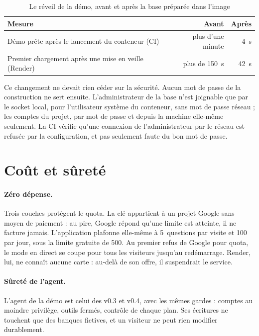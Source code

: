 \documentclass[11pt,a4paper]{article}
\begin{document}
\begin{table}[H]
\centering\small
\begin{tabularx}{\linewidth}{@{}Y r r@{}}
\toprule
Mesure & Avant & Après \\
\midrule
Démo prête après le lancement du conteneur (CI) & plus d'une minute & 4~s \\
Premier chargement après une mise en veille (Render) & plus de 150~s & 42~s \\
\bottomrule
\end{tabularx}
\caption{Le réveil de la démo, avant et après la base préparée dans l'image}
\end{table}

Ce changement ne devait rien céder sur la sécurité. Aucun mot de passe de la construction ne sert ensuite. L'administrateur de la base n'est joignable que par le socket local, pour l'utilisateur système du conteneur, sans mot de passe réseau ; les comptes du projet, par mot de passe et depuis la machine elle-même seulement. La CI vérifie qu'une connexion de l'administrateur par le réseau est refusée par la configuration, et pas seulement faute du bon mot de passe.

\section{Coût et sûreté}

\paragraph{Zéro dépense.} Trois couches protègent le quota. La clé appartient à un projet Google sans moyen de paiement : au pire, Google répond qu'une limite est atteinte, il ne facture jamais. L'application plafonne elle-même à 5~questions par visite et 100 par jour, sous la limite gratuite de 500. Au premier refus de Google pour quota, le mode en direct se coupe pour tous les visiteurs jusqu'au redémarrage. Render, lui, ne connaît aucune carte : au-delà de son offre, il suspendrait le service.

\paragraph{Sûreté de l'agent.} L'agent de la démo est celui des v0.3 et v0.4, avec les mêmes gardes : comptes au moindre privilège, outils fermés, contrôle de chaque plan. Ses écritures ne touchent que des banques fictives, et un visiteur ne peut rien modifier durablement.
\end{document}
